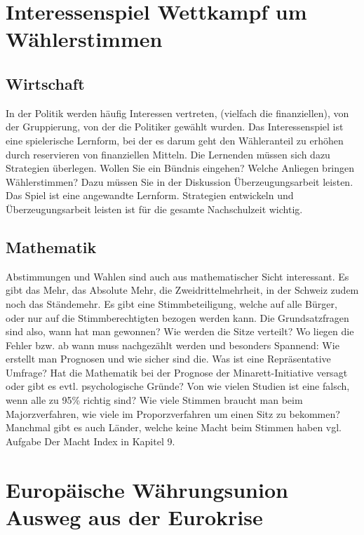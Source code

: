 \documentclass[11pt, twocolumn, a4paper]{scrartcl}
\begin{document}
\section{Interessenspiel \flqq Wettkampf um Wählerstimmen\frqq}
\subsection{Wirtschaft}
In der Politik werden häufig Interessen vertreten, (vielfach die finanziellen), von der Gruppierung, von der die Politiker gewählt wurden. Das \flqq Interessenspiel\frqq{} ist eine spielerische Lernform, bei der es darum geht den Wähleranteil zu erhöhen durch reservieren von finanziellen Mitteln. Die Lernenden müssen sich dazu Strategien überlegen. Wollen Sie ein Bündnis eingehen? Welche Anliegen bringen Wählerstimmen? Dazu müssen Sie in der Diskussion Überzeugungsarbeit leisten. Das Spiel ist eine angewandte Lernform. Strategien entwickeln und Überzeugungsarbeit leisten ist für die gesamte Nachschulzeit wichtig.
\subsection{Mathematik}
Abstimmungen und Wahlen sind auch aus mathematischer Sicht interessant. Es gibt das Mehr, das Absolute Mehr, die Zweidrittelmehrheit, in der Schweiz zudem noch das Ständemehr. Es gibt eine Stimmbeteiligung, welche auf alle Bürger, oder nur auf die Stimmberechtigten bezogen werden kann. Die Grundsatzfragen sind also, wann hat man gewonnen? Wie werden die Sitze verteilt? Wo liegen die Fehler bzw. ab wann muss nachgezählt werden und besonders Spannend: Wie erstellt man Prognosen und wie sicher sind die. Was ist eine Repräsentative Umfrage? Hat die Mathematik bei der Prognose der Minarett-Initiative versagt oder gibt es evtl. psychologische Gründe? Von wie vielen Studien ist eine falsch, wenn alle zu 95\% richtig sind? Wie viele Stimmen braucht man beim Majorzverfahren, wie viele im Proporzverfahren um einen Sitz zu bekommen?
Manchmal gibt es auch Länder, welche keine Macht beim Stimmen haben vgl. Aufgabe \flqq Der Macht Index\frqq{} in Kapitel 9.


\section{Europäische Währungsunion \flqq Ausweg aus der Eurokrise\frqq}
\end{document}

